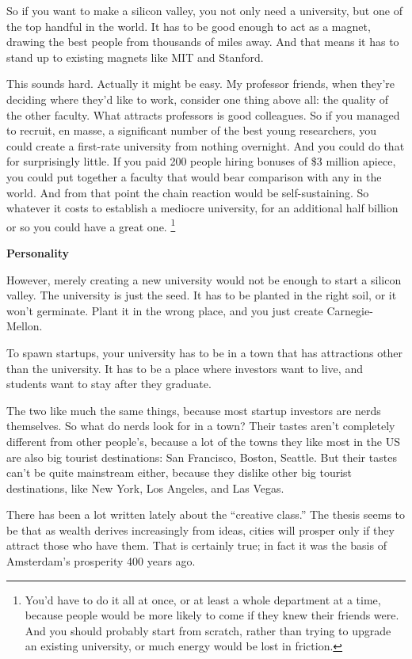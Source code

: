 \documentclass[12pt]{book}
\begin{document}
So if you want to make a silicon valley, you not only need a university,
but one of the top handful in the world. It has to be good enough to act
as a magnet, drawing the best people from thousands of miles away. And
that means it has to stand up to existing magnets like MIT and Stanford.

This sounds hard. Actually it might be easy. My professor friends, when
they're deciding where they'd like to work, consider one thing above
all: the quality of the other faculty. What attracts professors is good
colleagues. So if you managed to recruit, en masse, a significant number
of the best young researchers, you could create a first-rate university
from nothing overnight. And you could do that for surprisingly little.
If you paid 200 people hiring bonuses of \$3 million apiece, you could
put together a faculty that would bear comparison with any in the world.
And from that point the chain reaction would be self-sustaining. So
whatever it costs to establish a mediocre university, for an additional
half billion or so you could have a great one. \footnote{You'd have to do it all at once, or at least a whole department
at a time, because people would be more likely to come if they knew
their friends were. And you should probably start from scratch, rather
than trying to upgrade an existing university, or much energy would be
lost in friction.}

\textbf{Personality}

However, merely creating a new university would not be enough to start a
silicon valley. The university is just the seed. It has to be planted in
the right soil, or it won't germinate. Plant it in the wrong place, and
you just create Carnegie-Mellon.

To spawn startups, your university has to be in a town that has
attractions other than the university. It has to be a place where
investors want to live, and students want to stay after they graduate.

The two like much the same things, because most startup investors are
nerds themselves. So what do nerds look for in a town? Their tastes
aren't completely different from other people's, because a lot of the
towns they like most in the US are also big tourist destinations: San
Francisco, Boston, Seattle. But their tastes can't be quite mainstream
either, because they dislike other big tourist destinations, like New
York, Los Angeles, and Las Vegas.

There has been a lot written lately about the ``creative class.'' The
thesis seems to be that as wealth derives increasingly from ideas,
cities will prosper only if they attract those who have them. That is
certainly true; in fact it was the basis of Amsterdam's prosperity 400
years ago.
\end{document}
